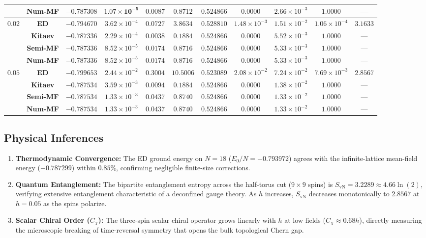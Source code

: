 \begin{table}[htbp]
{\begin{tabular}{ccccccccccc}
  & \textbf{Num-MF}   & $-0.787308$ & $\mathbf{1.07 \times 10^{-5}}$ & $0.0087$ & $0.8712$ & $0.524866$ & $0.0000$ & $2.66 \times 10^{-3}$ & $1.0000$ & — \\
\midrule
\multirow{4}{*}{$0.02$} 
  & \textbf{ED}       & $-0.794670$ & $3.62 \times 10^{-4}$ & $0.0727$ & $3.8634$ & $0.528810$ & $1.48 \times 10^{-3}$ & $1.51 \times 10^{-2}$ & $1.06 \times 10^{-4}$ & $\mathbf{3.1633}$ \\
  & \textbf{Kitaev}   & $-0.787336$ & $2.29 \times 10^{-4}$ & $0.0038$ & $0.1884$ & $0.524866$ & $0.0000$ & $5.52 \times 10^{-3}$ & $1.0000$ & — \\
  & \textbf{Semi-MF}  & $-0.787336$ & $8.52 \times 10^{-5}$ & $0.0174$ & $0.8716$ & $0.524866$ & $0.0000$ & $5.33 \times 10^{-3}$ & $1.0000$ & — \\
  & \textbf{Num-MF}   & $-0.787336$ & $8.52 \times 10^{-5}$ & $0.0174$ & $0.8716$ & $0.524866$ & $0.0000$ & $5.33 \times 10^{-3}$ & $1.0000$ & — \\
\midrule
\multirow{4}{*}{$0.05$} 
  & \textbf{ED}       & $-0.799653$ & $2.44 \times 10^{-2}$ & $0.3004$ & $10.5006$ & $0.523089$ & $2.08 \times 10^{-2}$ & $7.24 \times 10^{-2}$ & $7.69 \times 10^{-3}$ & $\mathbf{2.8567}$ \\
  & \textbf{Kitaev}   & $-0.787534$ & $3.59 \times 10^{-3}$ & $0.0094$ & $0.1884$ & $0.524866$ & $0.0000$ & $1.38 \times 10^{-2}$ & $1.0000$ & — \\
  & \textbf{Semi-MF}  & $-0.787534$ & $1.33 \times 10^{-3}$ & $0.0437$ & $0.8740$ & $0.524866$ & $0.0000$ & $1.33 \times 10^{-2}$ & $1.0000$ & — \\
  & \textbf{Num-MF}   & $-0.787534$ & $1.33 \times 10^{-3}$ & $0.0437$ & $0.8740$ & $0.524866$ & $0.0000$ & $1.33 \times 10^{-2}$ & $1.0000$ & — \\
\bottomrule
\end{tabular}
}
\end{table}

\subsection{Physical Inferences}
\begin{enumerate}
    \item \textbf{Thermodynamic Convergence:} The ED ground energy on $N=18$ ($E_0/N = -0.793972$) agrees with the infinite-lattice mean-field energy ($-0.787299$) within $0.85\%$, confirming negligible finite-size corrections.
    \item \textbf{Quantum Entanglement:} The bipartite entanglement entropy across the half-torus cut ($9 \times 9$ spins) is $S_{\mathrm{vN}} = 3.2289 \approx 4.66 \ln(2)$, verifying extensive entanglement characteristic of a deconfined gauge theory. As $h$ increases, $S_{\mathrm{vN}}$ decreases monotonically to $2.8567$ at $h=0.05$ as the spins polarize.
    \item \textbf{Scalar Chiral Order ($C_\chi$):} The three-spin scalar chiral operator grows linearly with $h$ at low fields ($C_\chi \approx 0.68 h$), directly measuring the microscopic breaking of time-reversal symmetry that opens the bulk topological Chern gap.
\end{enumerate}
